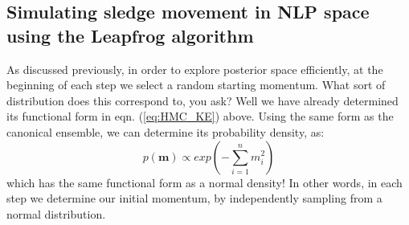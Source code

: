 \documentclass[11pt,fullpage]{book}
\begin{document}
\subsection{Simulating sledge movement in NLP space using the Leapfrog algorithm}
As discussed previously, in order to explore posterior space efficiently, at the beginning of each step we select a random starting momentum. What sort of distribution does this correspond to, you ask? Well we have already determined its functional form in eqn. (\ref{eq:HMC_KE}) above. Using the same form as the canonical ensemble, we can determine its probability density, as:
%
\begin{equation}
p(\boldsymbol{m}) \propto exp(-\sum\limits_{i=1}^{n} m_i^2)
\end{equation}
%
which has the same functional form as a normal density! In other words, in each step we determine our initial momentum, by independently sampling from a normal distribution.
\end{document}
